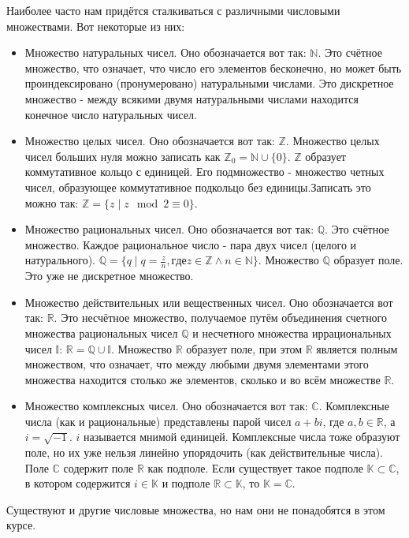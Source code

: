 \documentclass[a4paper]{book}
\begin{document}
Наиболее часто нам придётся сталкиваться с различными числовыми множествами. Вот некоторые из них: 
\begin{itemize}
	\item Множество натуральных чисел. Оно обозначается вот так: $\mathbb{N}$. Это счётное множество, что означает, что число его элементов бесконечно, но может быть проиндексировано (пронумеровано) натуральными числами. Это дискретное множество - между всякими двумя натуральными числами находится конечное число натуральных чисел. 
	\item Множество целых чисел. Оно обозначается вот так: $\mathbb{Z}$. Множество целых чисел больших нуля можно записать как $\mathbb{Z}_0 = \mathbb{N}\cup \{0\}$. $\mathbb{Z}$ образует коммутативное кольцо с единицей. Его подмножество - множество четных чисел, образующее коммутативное подкольцо без единицы.Записать это можно так: $ \mathbb{Z} = \{z\mid z\mod 2 \equiv 0\}$.
	\item Множество рациональных чисел. Оно обозначается вот так: $\mathbb{Q}$. Это счётное множество. Каждое рациональное число - пара двух чисел (целого и натурального). $\mathbb{Q} = \{q \mid q = \frac {z}{n}, где z \in \mathbb{Z} \wedge n \in \mathbb{N} \}$. Множество $\mathbb{Q}$ образует поле. Это уже не дискретное множество. 
	\item Множество действительных или вещественных чисел. Оно обозначается вот так: $\mathbb{R}$. Это несчётное множество, получаемое путём объединения счетного множества рациональных чисел $\mathbb{Q}$ и несчетного множества иррациональных чисел $\mathbb{I}$: $\mathbb{R} = \mathbb{Q} \cup \mathbb{I}$. Множество $\mathbb{R}$ образует поле, при этом $\mathbb{R}$ является полным множеством, что означает, что между любыми двумя элементами этого множества находится столько же элементов, сколько и во всём множестве $\mathbb{R}$.
	\item Множество комплексных чисел. Оно обозначается вот так: $\mathbb{C}$. Комплексные числа (как и рациональные) представлены парой чисел $a + bi$, где $a,b \in \mathbb{R}$, а $i = \sqrt{-1}$. $i$ называется мнимой единицей. Комплексные числа тоже образуют поле, но их уже нельзя линейно упорядочить (как действительные числа). Поле $\mathbb{C}$ содержит поле $\mathbb{R}$ как подполе. Если существует такое подполе $\mathbb{K} \subset \mathbb{C}$, в котором содержится $i \in \mathbb{K}$ и подполе $\mathbb{R} \subset \mathbb{K}$, то $\mathbb{K} = \mathbb{C}$.
	
\end{itemize}
 Существуют и другие числовые множества, но нам они не понадобятся в этом курсе. 
 
\end{document}

